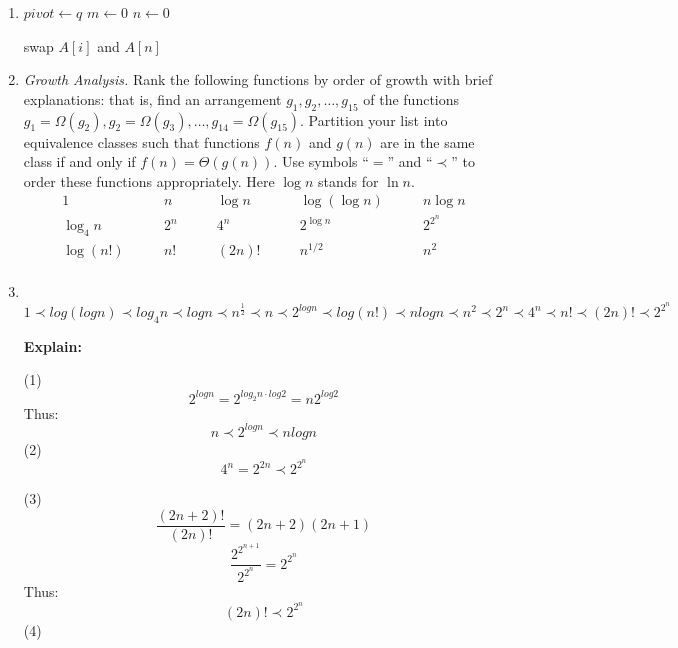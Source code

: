 \documentclass[12pt,a4paper]{article}
\makeatletter
\newtheorem*{solution}{Solution}
\theoremstyle{definition}
\renewenvironment{solution}[1][Solution] {\par\pushQED{\qed}\normalfont\topsep6\p@\@plus6\p@\relax\trivlist\item[\hskip\labelsep\bfseries#1\@addpunct{.}]\ignorespaces}{\popQED\endtrivlist\@endpefalse} \makeatother
\makeatother
\begin{document}
\begin{enumerate}
\begin{solution}
\begin{algorithm}[H]
		
		$pivot \leftarrow q$\;
		$m \leftarrow 0$\;
		$n \leftarrow 0$\;
		
		
		
		swap $A[i]$ and $A[n]$\;
	\end{algorithm}





    \end{solution}


\item \textit{Growth Analysis.} Rank the following functions by order of growth with brief explanations: that is, find an arrangement $g_1, g_2, \ldots , g_{15}$ of the functions $g_1 = \Omega(g_2), g_2 = \Omega(g_3), \ldots, g_{14} = \Omega(g_{15})$.  Partition your list into equivalence classes such that functions $f(n)$ and $g(n)$ are in the same class if and only if $f(n) = \Theta(g(n))$. Use symbols ``$=$'' and ``$\prec$'' to order these functions appropriately. Here $\log n$ stands for $\ln n$.
$$
\begin{array}{ccccc}
	1 \quad & \quad n \quad & \quad \log n \quad & \quad \log (\log n) \quad & \quad n \log n \\
	\log_4 n \quad & \quad 2^n \quad & \quad 4^n \quad & \quad 2^{\log n} \quad & \quad 2^{2^n} \\
	\log (n!) \quad & \quad n! \quad & \quad (2n)! \quad & \quad  n^{1/2} \quad & \quad n^2 \\
\end{array}
$$

\begin{solution}
~\\
$$
1 \prec log(logn) \prec log_4n\prec logn \prec n^{\frac{1}{2}} \prec n \prec 2^{logn} \prec log(n!) \prec nlogn \prec n^2 \prec 2^n \prec 4^n \prec n! \prec (2n)! \prec 2^{2^n}
$$

\textbf{Explain:}

(1)
$$
2^{logn} = 2^{log_2n \cdot log2} = n2^{log2}
$$
Thus:
$$
n\prec2^{logn}\prec nlogn
$$
(2)
$$
4^n = 2^{2n} \prec 2^{2^n}
$$

(3)
$$
\frac{(2n+2)! }{(2n)!}=(2n+2)(2n+1)
$$
$$
\frac{2^{2^{n+1}}}{2^{2^n}} = 2^{2^n}
$$
Thus:
$$
(2n)!\prec 2^{2^n}
$$
(4)


\end{solution}
\end{enumerate}
\end{document}
